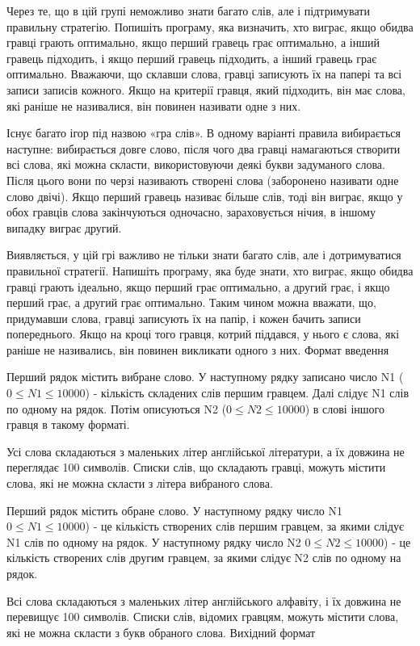 \documentclass[]{article}
\begin{document}
Через те, що в цій групі неможливо знати багато слів, але і підтримувати правильну стратегію. Попишіть програму, яка визначить, хто виграє, якщо обидва гравці грають оптимально, якщо перший гравець грає оптимально, а інший гравець підходить, і якщо перший гравець підходить, а інший гравець грає оптимально. Вважаючи, що склавши слова, гравці записують їх на папері та всі записи записів кожного. Якщо на критерії гравця, який підходить, він має слова, які раніше не називалися, він повинен називати одне з них.

Існує багато ігор під назвою «гра слів». В одному варіанті правила вибирається наступне: вибирається довге слово, після чого два гравці намагаються створити всі слова, які можна скласти, використовуючи деякі букви задуманого слова. Після цього вони по черзі називають створені слова (заборонено називати одне слово двічі). Якщо перший гравець називає більше слів, тоді він виграє, якщо у обох гравців слова закінчуються одночасно, зараховується нічия, в іншому випадку виграє другий.

Виявляється, у цій грі важливо не тільки знати багато слів, але і дотримуватися правильної стратегії. Напишіть програму, яка буде знати, хто виграє, якщо обидва гравці грають ідеально, якщо перший грає оптимально, а другий грає, і якщо перший грає, а другий грає оптимально. Таким чином можна вважати, що, придумавши слова, гравці записують їх на папір, і кожен бачить записи попереднього. Якщо на кроці того гравця, котрий піддався, у нього є слова, які раніше не називались, він повинен викликати одного з них.
Формат введення

Перший рядок містить вибране слово. У наступному рядку записано число N1 ($0 \le N1 \le 10000$) - кількість складених слів першим гравцем. Далі слідує N1 слів по одному на рядок. Потім описуються N2 ($0 \le N2 \le 10000$) в слові іншого гравця в такому форматі.

Усі слова складаються з маленьких літер англійської літератури, а їх довжина не переглядає 100 символів. Списки слів, що складають гравці, можуть містити слова, які не можна скласти з літера вибраного слова.

Перший рядок містить обране слово. У наступному рядку число N1 $0 \le N1 \le 10000$) - це кількість створених слів першим гравцем, за якими слідує N1 слів по одному на рядок. У наступному рядку число N2 $0 \le N2 \le 10000$) - це кількість створених слів другим гравцем, за якими слідує N2 слів по одному на рядок.

Всі слова складаються з маленьких літер англійського алфавіту, і їх довжина не перевищує 100 символів. Списки слів, відомих гравцям, можуть містити слова, які не можна скласти з букв обраного слова.
Вихідний формат
\end{document}
